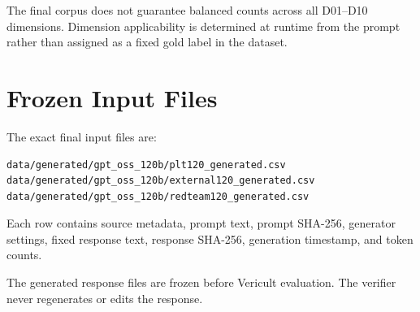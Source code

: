 The final corpus does not guarantee balanced counts across all D01--D10 dimensions. Dimension applicability is determined at runtime from the prompt rather than assigned as a fixed gold label in the dataset.

\section*{Frozen Input Files}

The exact final input files are:

\begin{lstlisting}
data/generated/gpt_oss_120b/plt120_generated.csv
data/generated/gpt_oss_120b/external120_generated.csv
data/generated/gpt_oss_120b/redteam120_generated.csv
\end{lstlisting}

Each row contains source metadata, prompt text, prompt SHA-256, generator settings, fixed response text, response SHA-256, generation timestamp, and token counts.

The generated response files are frozen before Vericult evaluation. The verifier never regenerates or edits the response.
